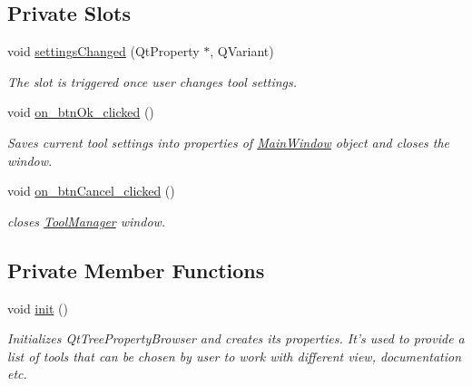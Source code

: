 \subsection*{Private Slots}
\begin{DoxyCompactItemize}
\item 
void \hyperlink{classToolManager_ad46d597d99731298489b34f4c25a6f00}{settings\-Changed} (Qt\-Property $\ast$, Q\-Variant)
\begin{DoxyCompactList}\small\item\em The slot is triggered once user changes tool settings. \end{DoxyCompactList}\item 
void \hyperlink{classToolManager_a2877a5eebdbf32bd984f58ba60087dfd}{on\-\_\-btn\-Ok\-\_\-clicked} ()
\begin{DoxyCompactList}\small\item\em Saves current tool settings into properties of \hyperlink{classMainWindow}{Main\-Window} object and closes the window. \end{DoxyCompactList}\item 
void \hyperlink{classToolManager_a5251e65adb28c3c8355ea2c16bfb2c2d}{on\-\_\-btn\-Cancel\-\_\-clicked} ()
\begin{DoxyCompactList}\small\item\em closes \hyperlink{classToolManager}{Tool\-Manager} window. \end{DoxyCompactList}\end{DoxyCompactItemize}
\subsection*{Private Member Functions}
\begin{DoxyCompactItemize}
\item 
void \hyperlink{classToolManager_a0ebfb9302faf76d53d4eafc48aad559a}{init} ()
\begin{DoxyCompactList}\small\item\em Initializes Qt\-Tree\-Property\-Browser and creates its properties. It's used to provide a list of tools that can be chosen by user to work with different view, documentation etc. \end{DoxyCompactList}\end{DoxyCompactItemize}
